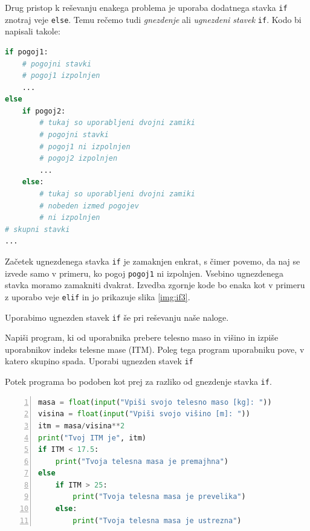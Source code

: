 Drug pristop k reševanju enakega problema je uporaba dodatnega stavka \texttt{if} znotraj veje \texttt{else}. Temu rečemo tudi \emph{gnezdenje} ali \emph{ugnezdeni stavek} \texttt{if}. Kodo bi napisali takole: \begin{lstlisting}[language=Python, showstringspaces=false]
if pogoj1:
    # pogojni stavki
    # pogoj1 izpolnjen
    ...
else
    if pogoj2:
        # tukaj so uporabljeni dvojni zamiki
        # pogojni stavki
        # pogoj1 ni izpolnjen
        # pogoj2 izpolnjen
        ...
    else:
        # tukaj so uporabljeni dvojni zamiki
        # nobeden izmed pogojev
        # ni izpolnjen
# skupni stavki
...
\end{lstlisting}
Začetek ugnezdenega stavka \texttt{if} je zamaknjen enkrat, s čimer povemo, da naj se izvede samo v primeru, ko pogoj \texttt{pogoj1} ni izpolnjen. Vsebino ugnezdenega stavka moramo zamakniti dvakrat. Izvedba zgornje kode bo enaka kot v primeru z uporabo veje \texttt{elif} in jo prikazuje slika \ref{img:if3}. 

Uporabimo ugnezden stavek \texttt{if} še pri reševanju naše naloge.
\begin{zgled}
Napiši program, ki od uporabnika prebere telesno maso in višino in izpiše uporabnikov indeks telesne mase (ITM). Poleg tega program uporabniku pove, v katero skupino spada. Uporabi ugnezden stavek \texttt{if}
\end{zgled}
\begin{resitev}
Potek programa bo podoben kot prej za razliko od gnezdenje stavka \texttt{if}.
\begin{lstlisting}[language=Python, showstringspaces=false,numbers=left]
masa = float(input("Vpiši svojo telesno maso [kg]: "))
visina = float(input("Vpiši svojo višino [m]: "))
itm = masa/visina**2
print("Tvoj ITM je", itm)
if ITM < 17.5:
    print("Tvoja telesna masa je premajhna")
else
    if ITM > 25:
        print("Tvoja telesna masa je prevelika")
    else:
        print("Tvoja telesna masa je ustrezna")
\end{lstlisting}
\end{resitev}
